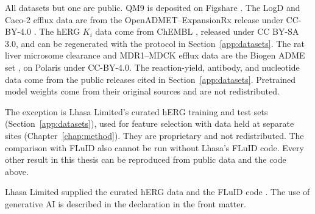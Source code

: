 All datasets but one are public. QM9 \citep{Ramakrishnan2014} is deposited on Figshare \citep{qm9_dataset}. The LogD and Caco-2 efflux data are from the OpenADMET--ExpansionRx release under CC-BY-4.0 \citep{openadmet}. The hERG $K_i$ data come from ChEMBL \citep{Zdrazil2023}, released under CC BY-SA 3.0, and can be regenerated with the protocol in Section~\ref{app:datasets}. The rat liver microsome clearance and MDR1--MDCK efflux data are the Biogen ADME set \citep{fang2023}, on Polaris \citep{polaris} under CC-BY-4.0. The reaction-yield, antibody, and nucleotide data come from the public releases cited in Section~\ref{app:datasets}. Pretrained model weights come from their original sources and are not redistributed.

The exception is Lhasa Limited's curated hERG training and test sets \citep{Hanser2025} (Section~\ref{app:datasets}), used for feature selection with data held at separate sites (Chapter~\ref{chap:method}). They are proprietary and not redistributed. The comparison with FLuID also cannot be run without Lhasa's FLuID code. Every other result in this thesis can be reproduced from public data and the code above.

Lhasa Limited supplied the curated hERG data and the FLuID code \citep{Hanser2025}. The use of generative AI is described in the declaration in the front matter.
